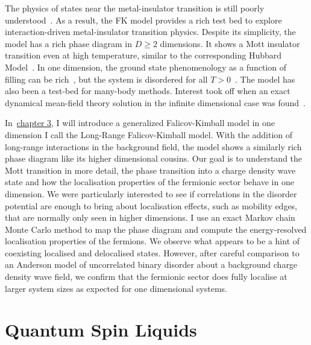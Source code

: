 The physics of states near the metal-insulator transition is still poorly understood~\autocite{belitzAndersonMottTransition1994,baskoMetalInsulatorTransition2006}. As a result, the FK model provides a rich test bed to explore interaction-driven metal-insulator transition physics. Despite its simplicity, the model has a rich phase diagram in \(D \geq 2\) dimensions. It shows a Mott insulator transition even at high temperature, similar to the corresponding Hubbard Model~\autocite{brandtThermodynamicsCorrelationFunctions1989}. In one dimension, the ground state phenomenology as a function of filling can be rich~\autocite{gruberGroundStatesSpinless1990}, but the system is disordered for all \(T > 0\)~\autocite{kennedyItinerantElectronModel1986}. The model has also been a test-bed for many-body methods. Interest took off when an exact dynamical mean-field theory solution in the infinite dimensional case was found~\autocite{antipovCriticalExponentsStrongly2014,ribicNonlocalCorrelationsSpectral2016,freericksExactDynamicalMeanfield2003,herrmannNonequilibriumDynamicalCluster2016}.

In~\protect\hyperlink{chap:3-the-long-range-falicov-kimball-model}{chapter 3}, I will introduce a generalized Falicov-Kimball model in one dimension I call the Long-Range Falicov-Kimball model. With the addition of long-range interactions in the background field, the model shows a similarly rich phase diagram like its higher dimensional cousins. Our goal is to understand the Mott transition in more detail, the phase transition into a charge density wave state and how the localisation properties of the fermionic sector behave in one dimension. We were particularly interested to see if correlations in the disorder potential are enough to bring about localisation effects, such as mobility edges, that are normally only seen in higher dimensions. I use an exact Markov chain Monte Carlo method to map the phase diagram and compute the energy-resolved localisation properties of the fermions. We observe what appears to be a hint of coexisting localised and delocalised states. However, after careful comparison to an Anderson model of uncorrelated binary disorder about a background charge density wave field, we confirm that the fermionic sector does fully localise at larger system sizes as expected for one dimensional systems.

\hypertarget{quantum-spin-liquids}{%
\section{Quantum Spin Liquids}\label{quantum-spin-liquids}}

